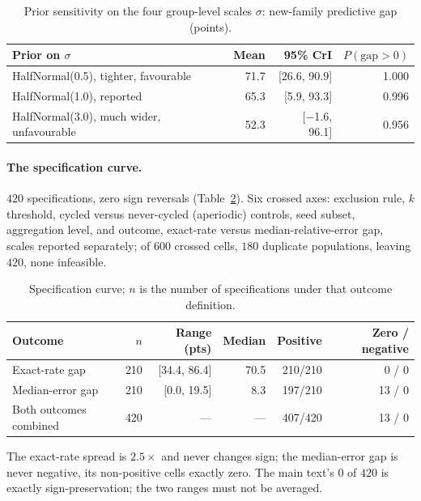 \begin{table}[tp]
\centering
\caption{Prior sensitivity on the four group-level scales $\sigma$: new-family
predictive gap (points).}
\label{tab:hier-prior}
\small
\begin{tabular}{@{}lrrr@{}}
\toprule
Prior on $\sigma$ & Mean & 95\% CrI & $P(\mathrm{gap}>0)$ \\
\midrule
HalfNormal(0.5), tighter, favourable & 71.7 & [26.6, 90.9] & 1.000 \\
HalfNormal(1.0), reported & 65.3 & [5.9, 93.3] & 0.996 \\
HalfNormal(3.0), much wider, unfavourable & 52.3 & [$-$1.6, 96.1] & 0.956 \\
\bottomrule
\end{tabular}
\end{table}

\paragraph{The specification curve.} $420$ specifications, zero sign reversals
(Table~\ref{tab:hier-spec}). Six crossed axes: exclusion rule, $k$ threshold, cycled versus
never-cycled (aperiodic) controls, seed subset, aggregation level, and outcome, exact-rate
versus median-relative-error gap, scales reported separately; of $600$ crossed cells, $180$
duplicate populations, leaving $420$, none infeasible.

\begin{table}[tp]
\centering
\caption{Specification curve; $n$ is the number of specifications under that
outcome definition.}
\label{tab:hier-spec}
\small
\begin{tabular}{@{}lrrrrr@{}}
\toprule
Outcome & $n$ & Range (pts) & Median & Positive & Zero / negative \\
\midrule
Exact-rate gap & 210 & [34.4, 86.4] & 70.5 & 210/210 & 0 / 0 \\
Median-error gap & 210 & [0.0, 19.5] & 8.3 & 197/210 & 13 / 0 \\
\midrule
Both outcomes combined & 420 & --- & --- & 407/420 & 13 / 0 \\
\bottomrule
\end{tabular}
\end{table}

The exact-rate spread is $2.5\times$ and never changes sign; the median-error gap is never
negative, its non-positive cells exactly zero. The main text's $0$ of $420$ is exactly
sign-preservation; the two ranges must not be averaged.

